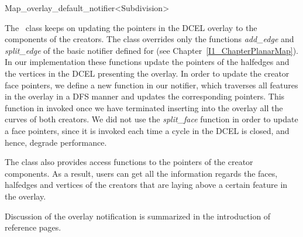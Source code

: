 
\ccRefPageBegin


\renewcommand{\ccRefPageBegin}{\begin{ccAdvanced}}
\renewcommand{\ccRefPageEnd}{\end{ccAdvanced}}

\begin{ccRefClass}{Map_overlay_default_notifier<Subdivision>}
\label{OVL_sec:notifier}

The \ccRefName\ class keeps on updating the pointers in the 
DCEL overlay to the components of the creators.
The \ccRefName class overrides only the functions {\it add\_edge} 
and {\it split\_edge} of the basic notifier defined for 
(see Chapter~\ref{I1_ChapterPlanarMap}). In our implementation these functions update 
the pointers of the halfedges and the vertices in the DCEL presenting the overlay.
In order to update the creator face pointers, we define a new function in our notifier, 
which traverses all features in the overlay in a DFS manner and updates the 
corresponding pointers. This function in invoked once we have terminated 
inserting into the overlay all the curves of both creators.
We did not use the {\it split\_face} function in order to update a face pointers, 
since it is invoked each time a cycle in the DCEL is closed, and hence, degrade performance.

The \ccRefName class also provides access functions to the pointers of the 
creator components. As a result, users can get all the information regards the 
faces, halfedges and vertices of the creators that are laying above a certain feature 
in the overlay.


\ccIsModel

\ccInheritsFrom

\ccSeeAlso
   Discussion of the overlay notification is summarized in the introduction
   of  reference pages.

\end{ccRefClass}
\renewcommand{\ccRefPageBegin}{}
\renewcommand{\ccRefPageEnd}{}


\ccRefPageEnd
